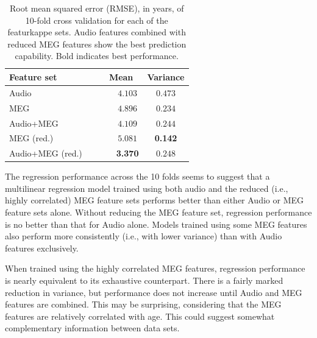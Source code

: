 \documentclass[utf8]{frontiersSCNS} %
\begin{document}
\begin{table}[t]
  \centering
  \label{tab:reg_results}
  \begin{tabular}{| l | c | c |}
    \toprule
    \multicolumn{1}{l}{\textbf{Feature set}} & \multicolumn{1}{c}{\textbf{Mean}} & \multicolumn{1}{c}{\textbf{Variance}} \\
    \toprule
        Audio~~~                             & ~~~$4.103$         &     $0.473$       \\
        MEG~~~                               & ~~~$4.896$         &     $0.234$       \\
        Audio+MEG~~~                         & ~~~$4.109$         &     $0.244$       \\

        \midrule
       
        MEG (red.)~~~                        & ~~~$5.081$         &     \textbf{0.142}       \\
        Audio+MEG (red.)~~~                  & ~~~\textbf{3.370}         &     $0.248$       \\

        \bottomrule
  \end{tabular}
  \caption{Root mean squared error (RMSE), in years, of 10-fold cross validation for each of the featurkappe sets. Audio features combined with reduced MEG features show the best prediction capability. Bold indicates best performance.}
\end{table}

The regression performance across the 10 folds seems to suggest that a multilinear regression model trained using both audio and the reduced (i.e., highly correlated) MEG feature sets performs better than either Audio or MEG feature sets alone. Without  reducing the MEG feature set, regression performance is no better than that for Audio alone. Models trained using some MEG features also  perform more consistently (i.e., with lower variance) than with Audio features exclusively.

When trained using the highly correlated MEG features, regression performance is nearly equivalent to its exhaustive counterpart. There is a fairly marked reduction in variance, but performance does not increase until Audio and MEG features are combined. This may be surprising, considering that the MEG features are relatively correlated with age. This could suggest somewhat complementary information between data sets. %
\end{document}
